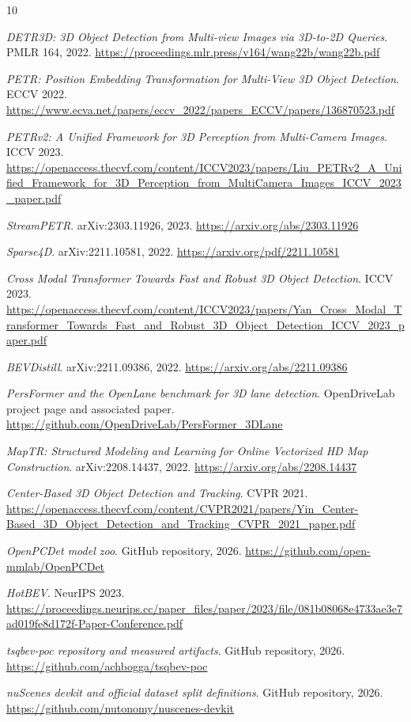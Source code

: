 \documentclass[11pt]{article}
\begin{document}
\begin{thebibliography}{10}

\emph{DETR3D: 3D Object Detection from Multi-view Images via 3D-to-2D Queries}.
PMLR 164, 2022.
\url{https://proceedings.mlr.press/v164/wang22b/wang22b.pdf}

\emph{PETR: Position Embedding Transformation for Multi-View 3D Object Detection}.
ECCV 2022.
\url{https://www.ecva.net/papers/eccv_2022/papers_ECCV/papers/136870523.pdf}

\emph{PETRv2: A Unified Framework for 3D Perception from Multi-Camera Images}.
ICCV 2023.
\url{https://openaccess.thecvf.com/content/ICCV2023/papers/Liu_PETRv2_A_Unified_Framework_for_3D_Perception_from_MultiCamera_Images_ICCV_2023_paper.pdf}

\emph{StreamPETR}.
arXiv:2303.11926, 2023.
\url{https://arxiv.org/abs/2303.11926}

\emph{Sparse4D}.
arXiv:2211.10581, 2022.
\url{https://arxiv.org/pdf/2211.10581}

\emph{Cross Modal Transformer Towards Fast and Robust 3D Object Detection}.
ICCV 2023.
\url{https://openaccess.thecvf.com/content/ICCV2023/papers/Yan_Cross_Modal_Transformer_Towards_Fast_and_Robust_3D_Object_Detection_ICCV_2023_paper.pdf}

\emph{BEVDistill}.
arXiv:2211.09386, 2022.
\url{https://arxiv.org/abs/2211.09386}

\emph{PersFormer and the OpenLane benchmark for 3D lane detection}.
OpenDriveLab project page and associated paper.
\url{https://github.com/OpenDriveLab/PersFormer_3DLane}

\emph{MapTR: Structured Modeling and Learning for Online Vectorized HD Map Construction}.
arXiv:2208.14437, 2022.
\url{https://arxiv.org/abs/2208.14437}

\emph{Center-Based 3D Object Detection and Tracking}.
CVPR 2021.
\url{https://openaccess.thecvf.com/content/CVPR2021/papers/Yin_Center-Based_3D_Object_Detection_and_Tracking_CVPR_2021_paper.pdf}

\emph{OpenPCDet model zoo}.
GitHub repository, 2026.
\url{https://github.com/open-mmlab/OpenPCDet}

\emph{HotBEV}.
NeurIPS 2023.
\url{https://proceedings.neurips.cc/paper_files/paper/2023/file/081b08068e4733ae3e7ad019fe8d172f-Paper-Conference.pdf}

\emph{tsqbev-poc repository and measured artifacts}.
GitHub repository, 2026.
\url{https://github.com/achbogga/tsqbev-poc}

\emph{nuScenes devkit and official dataset split definitions}.
GitHub repository, 2026.
\url{https://github.com/nutonomy/nuscenes-devkit}

\end{thebibliography}
\end{document}
